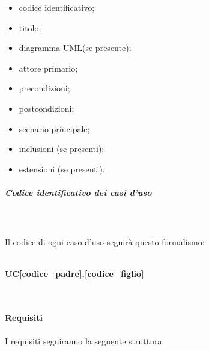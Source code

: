 				\begin{itemize}
					\item codice identificativo;
					\item titolo;
					\item diagramma UML\glo (se presente);
					\item attore primario;
					\item precondizioni;
					\item postcondizioni;
					\item scenario principale;
					\item inclusioni (se presenti);
					\item estensioni (se presenti).

				\end{itemize}
				\subparagraph*{Codice identificativo dei casi d'uso} \mbox{} \\ \mbox{} \\
			Il codice di ogni caso d'uso seguirà questo formalismo: \\ \\
			\centerline{\textbf{UC[codice\_padre].[codice\_figlio]}} \\ \\
			\textbf{Requisiti} \\ \\
			I requisiti seguiranno la seguente struttura:
